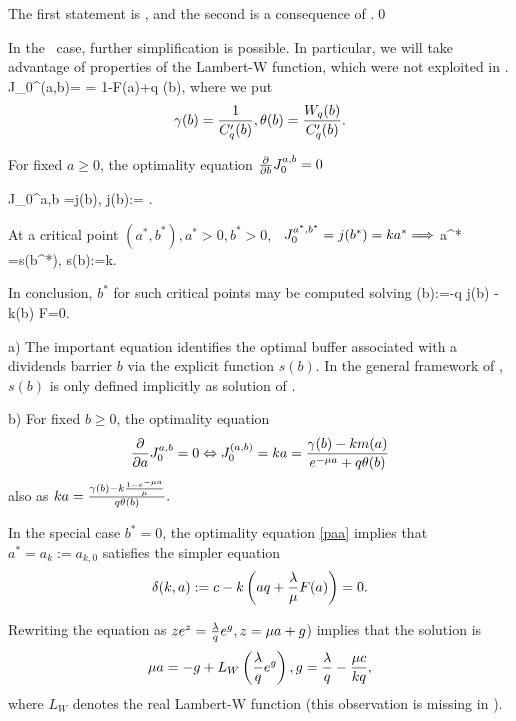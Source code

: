 \EEN
\eeP
\prf The first statement is \cite[Thm. 4]{Gaj}, and the second is a consequence of .\qed

In the \expo\ case, further simplification is possible. In particular, we will take advantage of properties of the Lambert-W function, which were not exploited in \cite{AGLW}.
\BEN \im
  \be J_0^{(a,b)}=
=
{ 1-F(a)+q \th(b)}, 
 \ee
where we put $$ \gamma(b)=\frac{1}{C_q'(b)}, \theta(b)=\frac{W_q(b)}{C_q'(b)}.$$

 \im For fixed  $a\geq 0$, the optimality equation $\frac{\partial}{\partial b} J_0^{a,b}=0$  \mbw

\be  J_0^{a,b}  =j(b), \; j(b):= . \ee

At a critical point $(a^*,b^*), a^*>0, b^* >0$,  \wmh\ $J_0^{a^*,b^*}  =j(b^*)=k a^* \Longrightarrow$
\be    a^* =s(b^*), s(b):=k. \ee

In conclusion, $b^*$ for such critical points may be computed solving
\be {} %
 \eta(b):=-q  j(b) - \fr k{\mu \th(b)}  F=0. \ee


\beR  a) The important equation  identifies  the optimal buffer associated with a dividends barrier $b$ via the explicit function $s(b)$. In the general framework of \cite{Gaj}, $s(b)$ is only defined implicitly as solution of   \cite[(6)]{Gaj}.

b) For fixed  $b\geq 0$, the optimality equation $$\frac{\partial}{\partial a} J_0^{a,b}=0  \Leftrightarrow  J_0^{(a,b)}= k a  =
 {
 \frac{\gamma(b)- k m(a)}
 {e^{-\mu a}+ q\theta(b)}}$$
 \mbw also as
 $k a=\frac{\gamma(b)- k \frac{1- e^{-\mu a}}\mu}{q\theta(b)}.$

\eeR



\im  In the special case $b^*=0$, the optimality equation \eqref{paa} implies that $a^*=a_k:=a_{k,0}$ satisfies
the simpler equation
\begin{align}\label{StructureEqa}
\d(k,a):=c -k\pr{a q + \fr{\l}{\mu} F( a)  }=0. %
\end{align}

\EEN






 Rewriting the equation  as $z e^z =\frac {\lambda} q e^{ g}, z=\mu a +g$) implies that the solution  is
$$\mu a =-g + L_W\left(\frac {\lambda} q e^{ g}\right), g=\frac{\lambda }{ q}-\frac{\mu c}{k q},$$
where $L_W$ denotes the real Lambert-W function \cite{corless1996lambertw,boyd1998global,brito2008euler,vazquez2019psem}
    (this observation is missing in \cite{AGLW}).
\eeC

